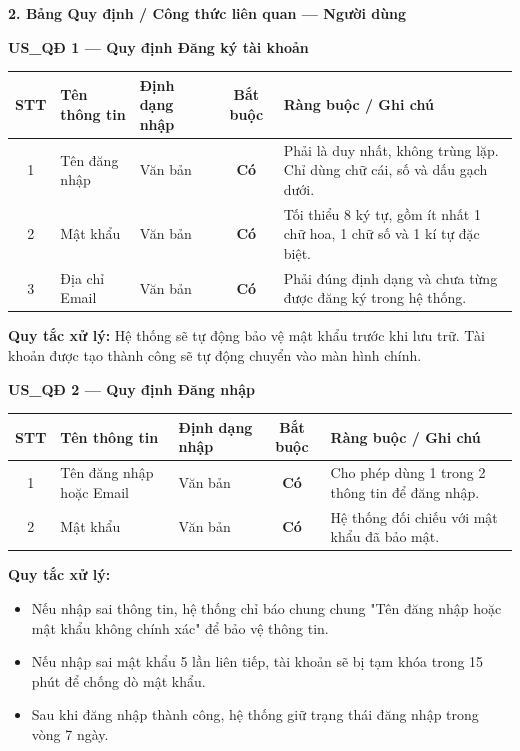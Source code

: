 \documentclass[12pt,a4paper]{article}
\begin{document}
\vspace{0.3cm}
\textbf{2. Bảng Quy định / Công thức liên quan --- Người dùng}

\vspace{0.2cm}
\noindent\textbf{US\_QĐ 1 --- Quy định Đăng ký tài khoản}
\begin{longtable}{|c|l|p{2.5cm}|c|p{5cm}|}
\hline
\rowcolor{headerblue}
\textbf{STT} & \textbf{Tên thông tin} & \textbf{Định dạng nhập} & \textbf{Bắt buộc} & \textbf{Ràng buộc / Ghi chú} \\
\hline
\endhead
1 & Tên đăng nhập & Văn bản & \textbf{Có} & Phải là duy nhất, không trùng lặp. Chỉ dùng chữ cái, số và dấu gạch dưới. \\
\hline
2 & Mật khẩu & Văn bản & \textbf{Có} & Tối thiểu 8 ký tự, gồm ít nhất 1 chữ hoa, 1 chữ số và 1 kí tự đặc biệt.\\
\hline
3 & Địa chỉ Email & Văn bản & \textbf{Có} & Phải đúng định dạng và chưa từng được đăng ký trong hệ thống. \\
\hline
\end{longtable}
\noindent\textbf{Quy tắc xử lý:} Hệ thống sẽ tự động bảo vệ mật khẩu trước khi lưu trữ. Tài khoản được tạo thành công sẽ tự động chuyển vào màn hình chính.

\vspace{0.4cm}
\noindent\textbf{US\_QĐ 2 --- Quy định Đăng nhập}
\begin{longtable}{|c|l|p{2.5cm}|c|p{5cm}|}
\hline
\rowcolor{headerblue}
\textbf{STT} & \textbf{Tên thông tin} & \textbf{Định dạng nhập} & \textbf{Bắt buộc} & \textbf{Ràng buộc / Ghi chú} \\
\hline
\endhead
1 & Tên đăng nhập hoặc Email & Văn bản & \textbf{Có} & Cho phép dùng 1 trong 2 thông tin để đăng nhập. \\
\hline
2 & Mật khẩu & Văn bản & \textbf{Có} & Hệ thống đối chiếu với mật khẩu đã bảo mật. \\
\hline
\end{longtable}
\noindent\textbf{Quy tắc xử lý:} 
\begin{itemize}
    \item Nếu nhập sai thông tin, hệ thống chỉ báo chung chung "Tên đăng nhập hoặc mật khẩu không chính xác" để bảo vệ thông tin.
    \item Nếu nhập sai mật khẩu 5 lần liên tiếp, tài khoản sẽ bị tạm khóa trong 15 phút để chống dò mật khẩu.
    \item Sau khi đăng nhập thành công, hệ thống giữ trạng thái đăng nhập trong vòng 7 ngày.
\end{itemize}
\end{document}
